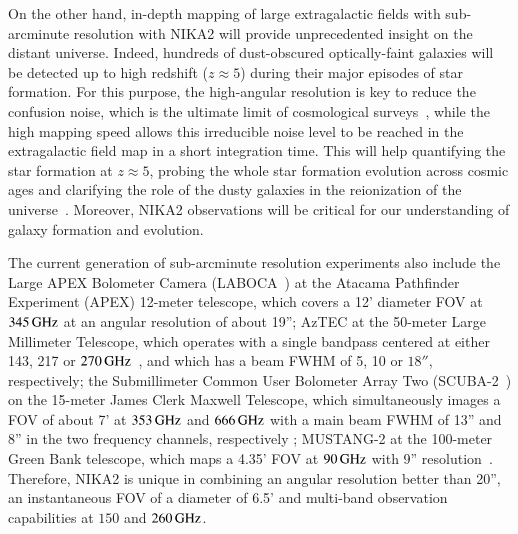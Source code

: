 On the other hand, in-depth mapping of large extragalactic fields with
sub-arcminute resolution with NIKA2 will provide unprecedented insight
on the distant universe. %
Indeed, hundreds of dust-obscured optically-faint galaxies will be
detected up to high redshift
($z \approx 5$) during their major episodes of star formation.
{\lp For this purpose, the high-angular resolution is key to reduce the
confusion noise, which is the ultimate limit of cosmological
surveys~\citep{Bethermin2017_simu}, while the high mapping speed allows
this irreducible noise level to be reached in the extragalactic field
map in a short integration time.}
This will help quantifying the star formation at $z \approx 5$, probing the whole
star formation evolution across cosmic ages and clarifying the
role of the dusty galaxies in the reionization of the
universe~\citep{Mancuso2016}. Moreover, NIKA2 observations will be critical for our
understanding of galaxy formation and evolution.


The current generation of sub-arcminute resolution experiments also
include the Large APEX Bolometer Camera
(LABOCA~\citep{Siringo2009_LABOCA}) at the Atacama
Pathfinder Experiment (APEX) 12-meter telescope, which covers a
12' diameter FOV at $345\, \rm{GHz}$ {\lp at an angular resolution of about
19''}; AzTEC at the 50-meter Large Millimeter Telescope, which operates with a
single bandpass centered at either 143, 217 or
$270\,\rm{GHz}$~\citep{Wilson2008_AZTEC}, {\lp and which has a beam
FWHM of 5, 10 or $18''$, respectively}; the Submillimeter Common User Bolometer
Array Two (SCUBA-2~\citep{Holland2013_SCUBA2,Dempsey2013_SCUBA2}) on the
15-meter James Clerk Maxwell Telescope, which simultaneously
images a FOV of about 7' %
at $353\,\rm{GHz}$ and $666\,\rm{GHz}$ {\lp with a main beam FWHM of 13''
and 8'' in the two frequency channels, respectively}
; MUSTANG-2 at the 100-meter Green Bank telescope,
which maps a 4.35' FOV at 
$90\,\rm{GHz}$ {\lp with 9'' resolution}~\citep{Dicker2014_MUSTANG2, Stanchfield2016_MUSTANG2}.
Therefore, NIKA2 is unique
in combining an angular resolution better than 20'', an instantaneous FOV of a
diameter of 6.5' and multi-band observation capabilities at $150$ and
$260\,\rm{GHz}$.


